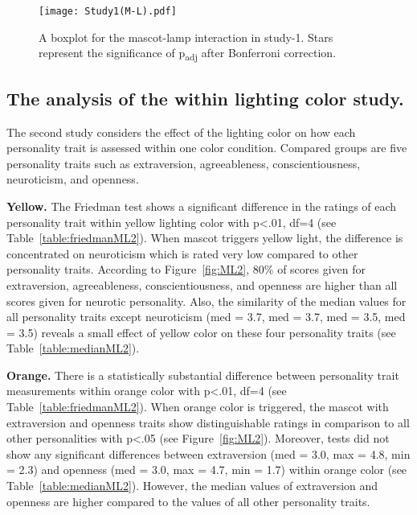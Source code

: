 \begin{figure}[hbt!]
    \centering
    \texttt{[image: Study1(M-L).pdf]}
    \caption[]{A boxplot for the mascot-lamp interaction in study-1.
    Stars represent the significance of p\textsubscript{adj} after Bonferroni correction.\footnotemark}
    \label{fig:ML1}
\end{figure}
\subsection{The analysis of the within lighting color study.}
\label{subsec:MLstudy2}
The second study considers the effect of the lighting color on how each
personality trait is assessed within one color condition.
Compared groups are five personality traits such as extraversion, agreeableness, conscientiousness,
neuroticism, and openness.

\par\textbf{Yellow.}
The Friedman test shows a significant difference in the ratings of each personality trait
within yellow lighting color with p<.01, df=4 (see Table~\ref{table:friedmanML2}).
When mascot triggers yellow light, the difference is concentrated on neuroticism
which is rated very low compared to other personality traits.
According to Figure~\ref{fig:ML2}, 80\% of scores given for extraversion, agreeableness,
conscientiousness, and openness are higher than all scores given for neurotic personality.
Also, the similarity of the median values for all personality traits except
neuroticism (med = 3.7, med = 3.7, med = 3.5, med = 3.5) reveals a small effect of yellow
color on these four personality traits (see Table~\ref{table:medianML2}).

\par\textbf{Orange.}
There is a statistically substantial difference between personality trait measurements within
orange color with p<.01, df=4 (see Table~\ref{table:friedmanML2}).
When orange color is triggered, the mascot with extraversion and openness traits
show distinguishable ratings in comparison to all other personalities with p<.05 (see Figure~\ref{fig:ML2}).
Moreover, tests did not show any significant differences between extraversion (med = 3.0, max = 4.8, min = 2.3)
and openness (med = 3.0, max = 4.7, min = 1.7) within orange color (see Table~\ref{table:medianML2}).
However, the median values of extraversion and openness are higher compared to the
values of all other personality traits.

